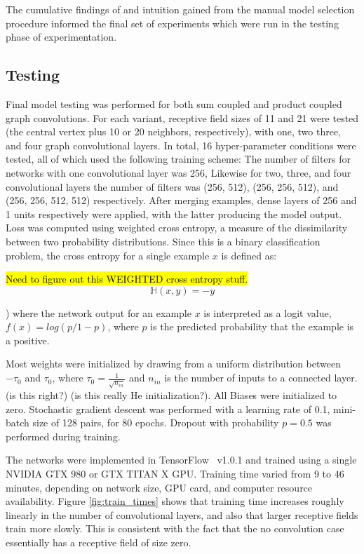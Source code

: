 The cumulative findings of and intuition gained from the manual model selection procedure informed the final set of experiments which were run in the testing phase of experimentation.

\subsection{Testing}

Final model testing was performed for both sum coupled and product coupled graph convolutions.
For each variant, receptive field sizes of 11 and 21 were tested (the central vertex plus 10 or 20 neighbors, respectively), with one, two three, and four graph convolutional layers. 
In total, 16 hyper-parameter conditions were tested, all of which used the following training scheme:
The number of filters for networks with one convolutional layer was 256, Likewise for two, three, and four convolutional layers the number of filters was (256, 512), (256, 256, 512), and (256, 256, 512, 512) respectively. 
After merging examples, dense layers of 256 and 1 units respectively were applied, with the latter producing the model output.
Loss was computed using weighted cross entropy, a measure of the dissimilarity between two probability distributions. 
Since this is a binary classification problem, the cross entropy for a single example $x$ is defined as: 

\hl{Need to figure out this WEIGHTED cross entropy stuff.}
\begin{equation}
\mathbb{H}(x, y) = - y 
\label{eq:weighted_ce}
\end{equation}

) where the network output for an example $x$ is interpreted as a logit value, $f(x)=log(p/{1-p})$, where $p$ is the predicted probability that the example is a positive.

Most weights were initialized by drawing from a uniform distribution between $-\tau_0$ and $\tau_0$, where $\tau_0=\frac{1}{\sqrt{n_{in}}}$ and $n_{in}$ is the number of inputs to a connected layer. (is this right?) (is this really He initialization?).
All Biases were initialized to zero.
Stochastic gradient descent was performed with a learning rate of 0.1, mini-batch size of 128 pairs, for 80 epochs. 
Dropout with probability $p=0.5$ was performed during training.

The networks were implemented in TensorFlow~\cite{abadi2015} v1.0.1 and trained using a single NVIDIA GTX 980 or GTX TITAN X GPU.
Training time varied from 9 to 46 minutes, depending on network size, GPU card, and computer resource availability.
Figure \ref{fig:train_times} shows that training time increases roughly linearly in the number of convolutional layers, and also that larger receptive fields train more slowly.
This is consistent with the fact that the no convolution case essentially has a receptive field of size zero.

